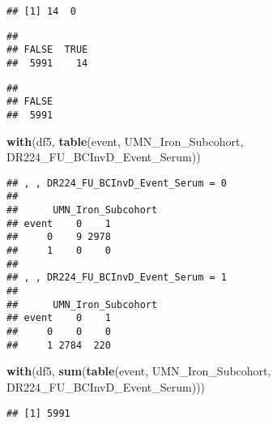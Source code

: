 \documentclass[
]{article}
\newenvironment{Shaded}{\begin{snugshade}}{\end{snugshade}}
\newcommand{\DecValTok}[1]{\textcolor[rgb]{0.00,0.00,0.81}{#1}}
\newcommand{\KeywordTok}[1]{\textcolor[rgb]{0.13,0.29,0.53}{\textbf{#1}}}
\newcommand{\NormalTok}[1]{#1}
\newcommand{\OperatorTok}[1]{\textcolor[rgb]{0.81,0.36,0.00}{\textbf{#1}}}
\newcommand{\StringTok}[1]{\textcolor[rgb]{0.31,0.60,0.02}{#1}}
\begin{document}
\begin{verbatim}
## [1] 14  0
\end{verbatim}

\begin{Shaded}
\end{Shaded}

\begin{verbatim}
## 
## FALSE  TRUE 
##  5991    14
\end{verbatim}

\begin{Shaded}
\end{Shaded}

\begin{verbatim}
## 
## FALSE 
##  5991
\end{verbatim}

\begin{Shaded}
\begin{Highlighting}[]
\KeywordTok{with}\NormalTok{(df5, }\KeywordTok{table}\NormalTok{(event, UMN_Iron_Subcohort, DR224_FU_BCInvD_Event_Serum))}
\end{Highlighting}
\end{Shaded}

\begin{verbatim}
## , , DR224_FU_BCInvD_Event_Serum = 0
## 
##      UMN_Iron_Subcohort
## event    0    1
##     0    9 2978
##     1    0    0
## 
## , , DR224_FU_BCInvD_Event_Serum = 1
## 
##      UMN_Iron_Subcohort
## event    0    1
##     0    0    0
##     1 2784  220
\end{verbatim}

\begin{Shaded}
\begin{Highlighting}[]
\KeywordTok{with}\NormalTok{(df5, }\KeywordTok{sum}\NormalTok{(}\KeywordTok{table}\NormalTok{(event, UMN_Iron_Subcohort, DR224_FU_BCInvD_Event_Serum)))}
\end{Highlighting}
\end{Shaded}

\begin{verbatim}
## [1] 5991
\end{verbatim}
\end{document}
